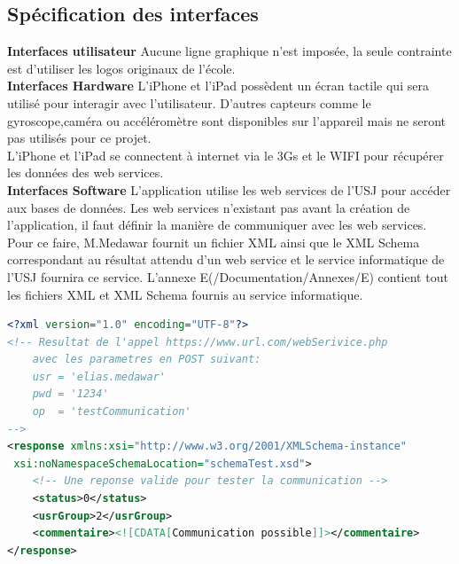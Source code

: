 	\subsection{Spécification des interfaces}
		\textbf{Interfaces utilisateur}  
			Aucune ligne graphique n'est imposée, la seule contrainte est d'utiliser les logos originaux de l'école.\\[0.2cm]
		\textbf{Interfaces Hardware} 
			L'iPhone et l'iPad possèdent un écran tactile qui sera utilisé pour interagir avec l'utilisateur. D'autres capteurs comme le gyroscope,caméra ou accéléromètre sont disponibles sur l'appareil mais ne seront pas utilisés pour ce projet. \\
			L'iPhone et l'iPad se connectent à internet via le 3Gs et le WIFI pour récupérer les données des web services.\\[0.2cm]
	 	\textbf{Interfaces Software} 
			L'application utilise les web services de l'\gls{USJ} pour accéder aux bases de données. Les web services n'existant pas avant la création de l'application, il faut définir la manière de communiquer avec les web services. Pour ce faire, M.Medawar fournit un fichier XML ainsi que le XML Schema correspondant au résultat attendu d'un web service et le service informatique de l'USJ fournira ce service.  L'annexe E(/Documentation/Annexes/E) contient tout les fichiers XML et XML Schema fournis au service informatique. \\

			  \begin{lstlisting}[language=XML,caption = Exemple de code XML fournit au service informatique de l'USJ]
<?xml version="1.0" encoding="UTF-8"?>
<!-- Resultat de l'appel https://www.url.com/webSerivice.php 
    avec les parametres en POST suivant:
    usr = 'elias.medawar'
    pwd = '1234'
    op  = 'testCommunication'
-->
<response xmlns:xsi="http://www.w3.org/2001/XMLSchema-instance"
 xsi:noNamespaceSchemaLocation="schemaTest.xsd">
    <!-- Une reponse valide pour tester la communication -->
    <status>0</status>
    <usrGroup>2</usrGroup>
    <commentaire><![CDATA[Communication possible]]></commentaire>
</response>
			\end{lstlisting}

